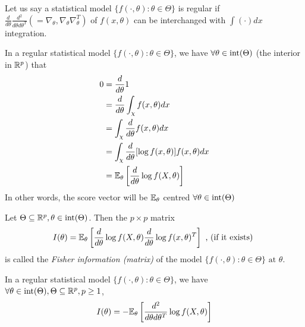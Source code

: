 \documentclass[a4paper]{article}
\begin{document}
Let us say a statistical model $\{f(\cdot , \theta) : \theta \in \Theta\} $ is regular if $\frac{d}{d \theta} \frac{d^2}{d \theta d \theta ^{T}} ( = \nabla_{\theta}, \nabla_{\theta} \nabla_{\theta}^{T} )$ of $f(x, \theta)$ can be interchanged with $\int (\cdot ) dx$ integration.

\begin{observation}[2]
	In a regular statistical model $\{f(\cdot , \theta) : \theta \in \Theta\}$, we have $\forall \theta \in\operatorname{int}(\Theta)$ (the interior in $\mathbb{R}^{p}$) that
	\begin{align*}
		0 &= \frac{d}{d \theta} 1 \\
		&= \frac{d}{d \theta} \int_{\chi} f(x, \theta) dx \\
		&= \int_{\chi} \frac{d}{d\theta} f(x,\theta) dx \\
		&= \int_{\chi} \frac{d}{d \theta} [\log f(x, \theta)] f(x, \theta) dx \\
		&= \mathbb{E}_{\theta} \left[ \frac{d}{d \theta} \log f(X, \theta) \right]
	\end{align*}
	In other words, the score vector will be $\mathbb{E}_{\theta}$ centred $\forall \theta \in\operatorname{int}(\Theta)$
\end{observation}

\begin{defn}
	Let $\Theta \subseteq \mathbb{R}^{p}, \theta \in \operatorname{int}(\Theta)$. Then the $p\times p$ matrix
	\[
		I(\theta) = \mathbb{E}_{\theta}\left[ \frac{d}{d \theta} \log f(X, \theta) \frac{d}{d \theta} \log f(x, \theta)^{T} \right] 
		\text{ , (if it exists) }
	\]
	is called the \textit{Fisher information (matrix)} of the model $\{f(\cdot , \theta) : \theta \in \Theta\} \text{ at } \theta$.
\end{defn}

\begin{prop}
	In a regular statistical model $\{f(\cdot , \theta) : \theta \in \Theta\}$, we have $\forall \theta \in\operatorname{int} (\Theta), \Theta \subseteq \mathbb{R}^{p}, p\ge 1 $,
	\[
		I(\theta) = - \mathbb{E}_{\theta} \left[ \frac{d^2}{d \theta d \theta^{T}} \log f(X, \theta) \right] 
	\] 
\end{prop}
\end{document}

